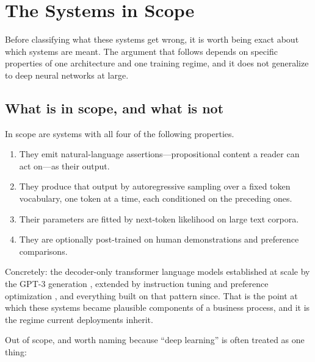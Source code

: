 \chapter{The Systems in Scope}
\label{ch:architecture-training}
\label{sec:architecture}

Before classifying what these systems get wrong, it is worth being exact about
which systems are meant. The argument that follows depends on specific properties
of one architecture and one training regime, and it does not generalize to deep
neural networks at large.

\section{What is in scope, and what is not}
\label{sec:scope}

In scope are systems with all four of the following properties.

\begin{enumerate}
  \item They emit natural-language assertions---propositional content a reader can
        act on---as their output.
  \item They produce that output by autoregressive sampling over a fixed token
        vocabulary, one token at a time, each conditioned on the preceding ones.
  \item Their parameters are fitted by next-token likelihood on large text
        corpora.
  \item They are optionally post-trained on human demonstrations and preference
        comparisons.
\end{enumerate}

Concretely: the decoder-only transformer language models established at scale by
the GPT-3 generation \citep{brown2020}, extended by instruction tuning and
preference optimization \citep{ouyang2022}, and everything built on that pattern
since. That is the point at which these systems became plausible components of a
business process, and it is the regime current deployments inherit.

Out of scope, and worth naming because ``deep learning'' is often treated as one
thing:

